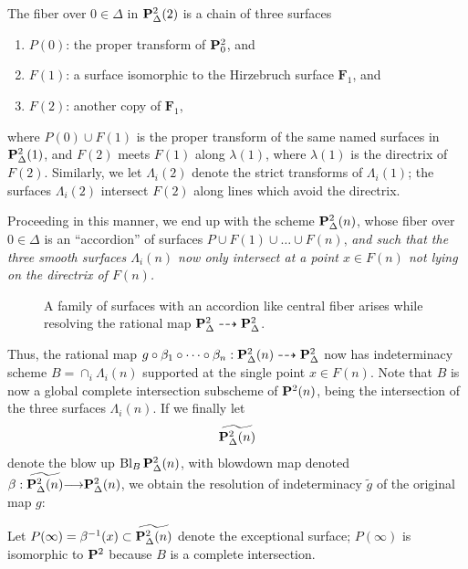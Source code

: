 \documentclass[12pt,reqno]{amsart}
\DeclareMathOperator{\Bl}{Bl}
\renewcommand{\to}{{\longrightarrow}}
\numberwithin{equation}{section}
\newcommand{\F}{\mathbf F}
\newcommand{\td}{\widetilde}
\begin{document}
The fiber over $0 \in \Delta$ in $\P^{2}_{\Delta}(2)$ is a chain of
three surfaces
\begin{enumerate}
\item $P(0)$: the proper transform of $\P^{2}_{0}$, and\\
\item $F(1)$: a surface isomorphic to the Hirzebruch surface $\F_{1}$, and\\
\item $F(2)$: another copy of $\F_{1}$, 
\end{enumerate}
where $P(0) \cup F(1)$ is the proper transform of the same named
surfaces in $\P^{2}_{\Delta}(1)$, and $F(2)$ meets $F(1)$ along
$\lambda(1)$, where $\lambda(1)$ is the directrix of
$F(2)$. Similarly, we let $\Lambda_{i}(2)$ denote the strict
transforms of $\Lambda_{i}(1)$; the surfaces $\Lambda_{i}(2)$
intersect $F(2)$ along lines which avoid the directrix.

Proceeding in this manner, we end up with the scheme
$\P^{2}_{\Delta}(n)$, whose fiber over $0 \in \Delta$ is an
``accordion'' of surfaces $P \cup F(1) \cup \dots \cup F(n)$, {\sl and
  such that the three smooth surfaces $\Lambda_{i}(n)$ now only
  intersect at a point $x \in F(n)$ not lying on the directrix of
  $F(n)$.}

\begin{figure}
  \centering
  
  \caption{A family of surfaces with an accordion like central fiber arises while resolving the rational map $\P^2_\Delta \dashrightarrow \P^2_\Delta$.}
\end{figure}

Thus, the rational map
$g \circ \beta_{1} \circ \dots \circ \beta_{n}: \P^{2}_{\Delta}(n)
\dashrightarrow \P^{2}_{\Delta}$ now has indeterminacy scheme
$B = \cap_{i} \Lambda_{i}(n)$ supported at the single point
$x \in F(n)$.  Note that $B$ is now a global complete intersection
subscheme of $\P^{2}(n)$, being the intersection of the three surfaces
$\Lambda_{i}(n)$. If we finally let
\[\td{\P^{2}_{\Delta}(n)}\]
denote the blow up $\Bl_{B}\P^{2}_{\Delta}(n)$, with blowdown map
denoted $\beta: \td{\P^{2}_{\Delta}(n)} \to \P^{2}_{\Delta}(n)$, we
obtain the resolution of indeterminacy $\td{g}$ of the original map
$g$:
\begin{center}
\end{center}
Let $P(\infty) = \beta^{-1}(x) \subset \td{\P^{2}_{\Delta}(n)}$ denote
the exceptional surface; $P(\infty)$ is isomorphic to $\P^{2}$ because
$B$ is a complete intersection.
\end{document}
